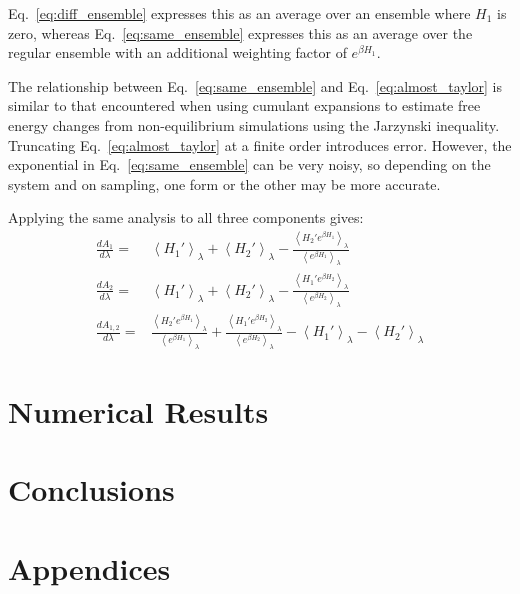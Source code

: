 \documentclass{article}
\begin{document}
Eq.~\ref{eq:diff_ensemble} expresses this as an average over an ensemble where $H_1$ is zero, whereas Eq.~\ref{eq:same_ensemble} expresses this as an average over the regular ensemble with an additional weighting factor of $e^{\beta H_1}$.

The relationship between Eq.~\ref{eq:same_ensemble} and Eq.~\ref{eq:almost_taylor} is similar to that encountered when using cumulant expansions to estimate free energy changes from non-equilibrium simulations using the Jarzynski inequality. Truncating Eq.~\ref{eq:almost_taylor} at a finite order introduces error. However, the exponential in Eq.~\ref{eq:same_ensemble} can be very noisy, so depending on the system and on sampling, one form or the other may be more accurate.

Applying the same analysis to all three components gives:
\begin{align*}
\frac{dA_1}{d\lambda} =&
	\left\langle
		H_1'
	\right\rangle_\lambda +
	\left\langle
		H_2'
	\right\rangle_\lambda -
	\frac
		{\left\langle H_2' e^{\beta H_1} \right\rangle_\lambda}
		{\left\langle e^{\beta H_1} \right\rangle_\lambda} \\
\frac{dA_2}{d\lambda} =&
	\left\langle
		H_1'
	\right\rangle_\lambda +
	\left\langle
		H_2'
	\right\rangle_\lambda -
	\frac
		{\left\langle H_1' e^{\beta H_2} \right\rangle_\lambda}
		{\left\langle e^{\beta H_2} \right\rangle_\lambda} \\
\frac{dA_{1,2}}{d\lambda} =&
	\frac
		{\left\langle H_2' e^{\beta H_1} \right\rangle_\lambda}
		{\left\langle e^{\beta H_1} \right\rangle_\lambda} +
	\frac
		{\left\langle H_1' e^{\beta H_2} \right\rangle_\lambda}
		{\left\langle e^{\beta H_2} \right\rangle_\lambda} -
	\left\langle
		H_1'
	\right\rangle_\lambda -
	\left\langle
		H_2'
	\right\rangle_\lambda
\end{align*}





\section{Numerical Results}

\section{Conclusions}

\section*{Appendices}
\end{document}
